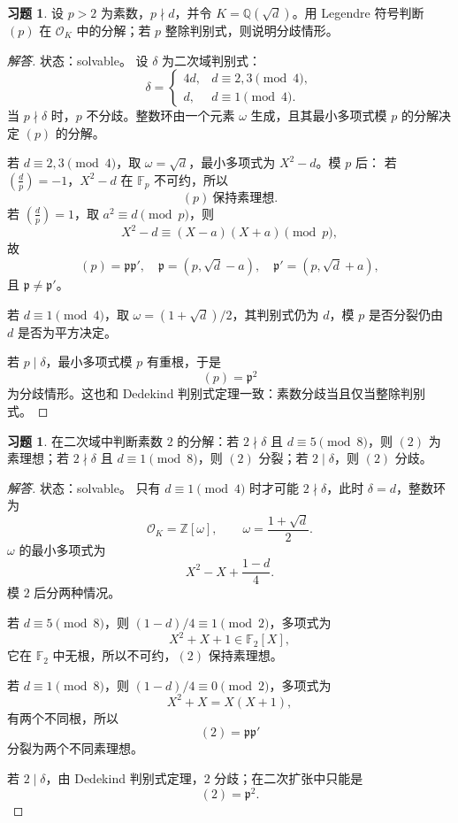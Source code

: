 \documentclass[11pt,a4paper,openany]{ctexbook}
\numberwithin{equation}{chapter}
\newcommand{\Q}{\mathbb{Q}}
\newcommand{\Z}{\mathbb{Z}}
\newcommand{\F}{\mathbb{F}}
\theoremstyle{plain}
\theoremstyle{definition}
\newtheorem{exercise}[theorem]{习题}
\theoremstyle{remark}
\begin{document}
\begin{exercise}
设 $p>2$ 为素数，$p\nmid d$，并令 $K=\Q(\sqrt d)$。用 Legendre 符号判断 $(p)$ 在 $\mathcal O_K$ 中的分解；若 $p$ 整除判别式，则说明分歧情形。
\end{exercise}

\begin{proof}[解答]
状态：solvable。
设 $\delta$ 为二次域判别式：
\[
\delta=
\begin{cases}
4d,&d\equiv2,3\pmod4,\\
d,&d\equiv1\pmod4.
\end{cases}
\]
当 $p\nmid\delta$ 时，$p$ 不分歧。整数环由一个元素 $\omega$ 生成，且其最小多项式模 $p$ 的分解决定 $(p)$ 的分解。

若 $d\equiv2,3\pmod4$，取 $\omega=\sqrt d$，最小多项式为 $X^2-d$。模 $p$ 后：
若 $\left(\frac d p\right)=-1$，$X^2-d$ 在 $\F_p$ 不可约，所以
\[
(p)\ \text{保持素理想}.
\]
若 $\left(\frac d p\right)=1$，取 $a^2\equiv d\pmod p$，则
\[
X^2-d\equiv(X-a)(X+a)\pmod p,
\]
故
\[
(p)=\mathfrak p\mathfrak p',
\quad
\mathfrak p=(p,\sqrt d-a),\quad
\mathfrak p'=(p,\sqrt d+a),
\]
且 $\mathfrak p\ne\mathfrak p'$。

若 $d\equiv1\pmod4$，取 $\omega=(1+\sqrt d)/2$，其判别式仍为 $d$，模 $p$ 是否分裂仍由 $d$ 是否为平方决定。

若 $p\mid\delta$，最小多项式模 $p$ 有重根，于是
\[
(p)=\mathfrak p^2
\]
为分歧情形。这也和 Dedekind 判别式定理一致：素数分歧当且仅当整除判别式。
\end{proof}

\begin{exercise}
在二次域中判断素数 $2$ 的分解：若 $2\nmid\delta$ 且 $d\equiv5\pmod8$，则 $(2)$ 为素理想；若 $2\nmid\delta$ 且 $d\equiv1\pmod8$，则 $(2)$ 分裂；若 $2\mid\delta$，则 $(2)$ 分歧。
\end{exercise}

\begin{proof}[解答]
状态：solvable。
只有 $d\equiv1\pmod4$ 时才可能 $2\nmid\delta$，此时 $\delta=d$，整数环为
\[
\mathcal O_K=\Z[\omega],\qquad \omega=\frac{1+\sqrt d}{2}.
\]
$\omega$ 的最小多项式为
\[
X^2-X+\frac{1-d}{4}.
\]
模 $2$ 后分两种情况。

若 $d\equiv5\pmod8$，则 $(1-d)/4\equiv1\pmod2$，多项式为
\[
X^2+X+1\in\F_2[X],
\]
它在 $\F_2$ 中无根，所以不可约，$(2)$ 保持素理想。

若 $d\equiv1\pmod8$，则 $(1-d)/4\equiv0\pmod2$，多项式为
\[
X^2+X=X(X+1),
\]
有两个不同根，所以
\[
(2)=\mathfrak p\mathfrak p'
\]
分裂为两个不同素理想。

若 $2\mid\delta$，由 Dedekind 判别式定理，$2$ 分歧；在二次扩张中只能是
\[
(2)=\mathfrak p^2.
\]
\end{proof}
\end{document}
